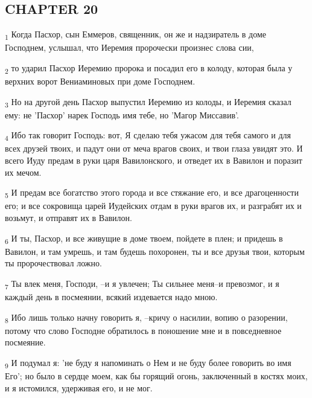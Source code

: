 \subsection{CHAPTER 20}
\begin{tcolorbox}
\textsubscript{1} Когда Пасхор, сын Еммеров, священник, он же и надзиратель в доме Господнем, услышал, что Иеремия пророчески произнес слова сии,
\end{tcolorbox}
\begin{tcolorbox}
\textsubscript{2} то ударил Пасхор Иеремию пророка и посадил его в колоду, которая была у верхних ворот Вениаминовых при доме Господнем.
\end{tcolorbox}
\begin{tcolorbox}
\textsubscript{3} Но на другой день Пасхор выпустил Иеремию из колоды, и Иеремия сказал ему: не 'Пасхор' нарек Господь имя тебе, но 'Магор Миссавив'.
\end{tcolorbox}
\begin{tcolorbox}
\textsubscript{4} Ибо так говорит Господь: вот, Я сделаю тебя ужасом для тебя самого и для всех друзей твоих, и падут они от меча врагов своих, и твои глаза увидят это. И всего Иуду предам в руки царя Вавилонского, и отведет их в Вавилон и поразит их мечом.
\end{tcolorbox}
\begin{tcolorbox}
\textsubscript{5} И предам все богатство этого города и все стяжание его, и все драгоценности его; и все сокровища царей Иудейских отдам в руки врагов их, и разграбят их и возьмут, и отправят их в Вавилон.
\end{tcolorbox}
\begin{tcolorbox}
\textsubscript{6} И ты, Пасхор, и все живущие в доме твоем, пойдете в плен; и придешь в Вавилон, и там умрешь, и там будешь похоронен, ты и все друзья твои, которым ты пророчествовал ложно.
\end{tcolorbox}
\begin{tcolorbox}
\textsubscript{7} Ты влек меня, Господи, --и я увлечен; Ты сильнее меня--и превозмог, и я каждый день в посмеянии, всякий издевается надо мною.
\end{tcolorbox}
\begin{tcolorbox}
\textsubscript{8} Ибо лишь только начну говорить я, --кричу о насилии, вопию о разорении, потому что слово Господне обратилось в поношение мне и в повседневное посмеяние.
\end{tcolorbox}
\begin{tcolorbox}
\textsubscript{9} И подумал я: 'не буду я напоминать о Нем и не буду более говорить во имя Его'; но было в сердце моем, как бы горящий огонь, заключенный в костях моих, и я истомился, удерживая его, и не мог.
\end{tcolorbox}
